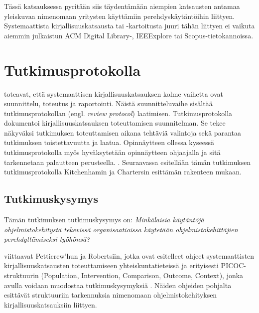 \documentclass[utf8]{gradu3}
\begin{document}
Tässä katsauksessa pyritään siis täydentämään aiempien katsausten antamaa yleiskuvaa nimenomaan yritysten käyttämiin perehdyskäytäntöihin liittyen. Systemaattista kirjallisuuskatsausta tai -kartoitusta juuri tähän liittyen ei vaikuta aiemmin julkaistun ACM Digital Library-, IEEExplore tai Scopus-tietokannoissa. 

\chapter{Tutkimusprotokolla}

\textcite{kitchenham-charters-2007} toteavat, että systemaattisen kirjallisuuskatsauksen kolme vaihetta ovat suunnittelu, toteutus ja raportointi. Näistä suunnitteluvaihe sisältää tutkimusprotokollan (engl. \textit{review protocol}) laatimisen. Tutkimusprotokolla dokumentoi kirjallisuuskatsauksen toteuttamisen suunnitelman. Se tekee näkyväksi tutkimuksen toteuttamisen aikana tehtäviä valintoja sekä parantaa tutkimuksen toistettavuutta ja laatua. Opinnäytteen ollessa kyseessä tutkimusprotokolla myös hyväksytetään opinnäytteen ohjaajalla ja sitä tarkennetaan palautteen perusteella. \parencite{kitchenham-charters-2007}. Seuraavassa esitellään tämän tutkimuksen tutkimusprotokolla Kitchenhamin ja Chartersin esittämän rakenteen mukaan.

\section{Tutkimuskysymys}
\label{luku:tutkimuskysymys}

Tämän tutkimuksen tutkimuskysymys on: \textit{Minkälaisia käytäntöjä ohjelmistokehitystä tekevissä organisaatioissa käytetään ohjelmistokehittäjien perehdyttämiseksi työhönsä?}

\textcite{kitchenham-charters-2007} viittaavat Petticrew'hun ja Robertsiin, jotka ovat esitelleet ohjeet systemaattisten kirjallisuuskatsausten toteuttamiseen yhteiskuntatieteissä ja erityisesti PICOC-struktuurin (Population, Intervention, Comparison, Outcome, Context), jonka avulla voidaan muodostaa tutkimuskysymyksiä \parencite{petticrew-roberts-2006}. Näiden ohjeiden pohjalta \textcite{kitchenham-charters-2007} esittävät struktuuriin tarkennuksia nimenomaan ohjelmistokehityksen kirjallisuuskatsauksiin liittyen. 
\end{document}
